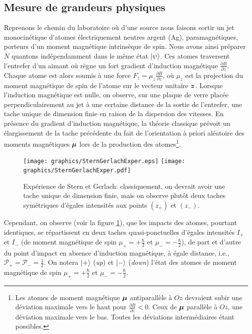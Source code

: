 \subsection{Mesure de grandeurs physiques}
\label{sec:ExpSG}

Reprenons le chemin du laboratoire où d'une source nous faisons sortir un jet
monocinétique d'atomes électriquement neutres argent (Ag), paramagnétiques,
porteurs d'un moment magnétique intrinsèque de spin. Nous avons ainsi préparer
$N$ quantons indépendamment dans le même état $\vert\psi\rangle$. Ces atomes
traversent l'entrefer d'un aimant où règne un fort gradient d'induction
magnétique $\frac{\partial B}{\partial z}$. Chaque atome est alors soumis à une
force $F_{z}=\mu_{z}\frac{\partial B}{\partial z}$, où $\mu_{z}$ est la
projection du moment magnétique de spin de l'atome sur le vecteur unitaire
$\boldsymbol{z}$. Lorsque l'induction magnétique est nulle, on observe, sur une
plaque de verre placée perpendiculairement au jet à une certaine distance de la
sortie de l'entrefer, une tache unique de dimension finie en raison de la
dispersion des vitesses. En présence du gradient d'induction magnétique, la
théorie classique prévoit un élargissement de la tache précédente du fait de
l'orientation à priori aléatoire des moments magnétiques $\boldsymbol{\mu}$ lors
de la production des atomes\footnote{Les atomes de moment magnétique
$\boldsymbol{\mu}$ antiparallèle à $Oz$ devraient subir une déviation maximale
vers le haut pour $\frac{\partial B}{\partial z}<0$. Ceux de $\boldsymbol{\mu}$
parallèle à $Oz$, une déviation maximale vers le bas. Toutes les déviations
intermédiaires étant possibles.}.

\begin{figure}[ptbh]
\centering
\ifcase\msipdfoutput
  \texttt{[image: graphics/SternGerlachExper.eps]}
\else
  \texttt{[image: graphics/SternGerlachExper.pdf]}
\fi
\caption{Expérience de Stern et Gerlach: classiquement, on devrait avoir une
tache unique de dimension finie, mais on observe plutôt deux taches
symétriques d'égales intensités aux points $(z_{+})$ et $(z_{-})$.}%
\label{fig:SternGerlachExper}%
\end{figure}

Cependant, on observe (voir la figure \ref{fig:SternGerlachExper}), que les
impacts des atomes, pourtant identiques, se répartissent en deux taches
quasi-ponctuelles d'égales intensités $I_{+}$ et $I_{-}$ (de moment magnétique
de spin $\mu_{+}=+\frac{\hbar}{2}$ et $\mu_{-}=-\frac{\hbar}{2}$), de part et
d'autre du point d'impact en absence d'induction magnétique, à égale distance,
i.e., $\mathcal{P}_{+}=\mathcal{P}_{-}=\frac{1}{2}$. On notera $\vert+\rangle$
(\emph{up}) et $\vert-\rangle$ (\emph{down}) l'état des atomes de moment magnétique de
spin $\mu_{+}=+\frac{\hbar}{2}$ et $\mu_{-}=-\frac{\hbar}{2}$.


